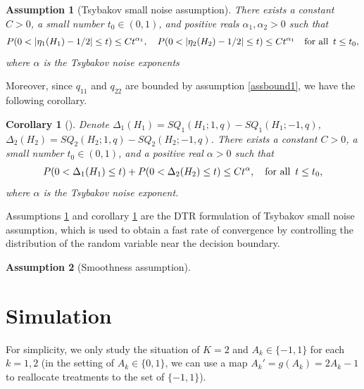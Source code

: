 \documentclass[10pt]{article}
\newtheorem{ass}{Assumption}
\newtheorem{cor}{Corollary}
\theoremstyle{remark} \newtheorem{rem}{Remark}
\begin{document}
\begin{ass}[Tsybakov small noise assumption]
    There exists a constant $C>0$, a small number $t_0\in(0,1)$, and positive reals $\alpha_1,\alpha_2>0$ such that
    \begin{align}
        P(0<|\eta_1(H_1)-1/2|\leq t) \leq Ct^{\alpha_1}, \quad P(0<|\eta_2(H_2)-1/2|\leq t) \leq Ct^{\alpha_1} \text{\quad for all\, } t\leq t_0,
    \end{align}
    where $\alpha$ is the Tsybakov noise exponents
    \label{assbound3.1}
\end{ass}
Moreover, since $q_{11}$ and $q_{22}$ are bounded by assumption \ref{assbound1}, we have the following corollary.
\begin{cor}[]
Denote $\Delta_{1}(H_1) = SQ_1(H_1;1,q) - SQ_1(H_1;-1,q)$, $\Delta_{2}(H_2) = SQ_2(H_2;1,q) - SQ_2(H_2;-1,q)$. There exists a constant $C>0$, a small number $t_0\in(0,1)$, and a positive real $\alpha>0$ such that
    \begin{align}
        P(0<\Delta_1(H_1)\le t) + P(0<\Delta_2(H_2)\le t) \le Ct^\alpha, \text{\quad for all\, } t\leq t_0,
     \end{align}
    where $\alpha$ is the Tsybakov noise exponent.
    \label{assbound3.2}
\end{cor}
Assumptions \ref{assbound3.1} and corollary \ref{assbound3.2} are the DTR formulation of Tsybakov small noise assumption, which is used to obtain a fast rate of convergence by controlling the distribution of the random variable near the decision boundary.

\begin{ass}[Smoothness assumption]

\end{ass}



\section{Simulation}
For simplicity, we only study the situation of $K=2$ and $A_k \in \{-1,1\}$ for each $k=1,2$ (in the setting of $A_k \in \{0,1\}$, we can use a map $A_k'=g(A_k) = 2A_k-1$ to reallocate treatments to the set of $\{-1,1\}$).
\end{document}
